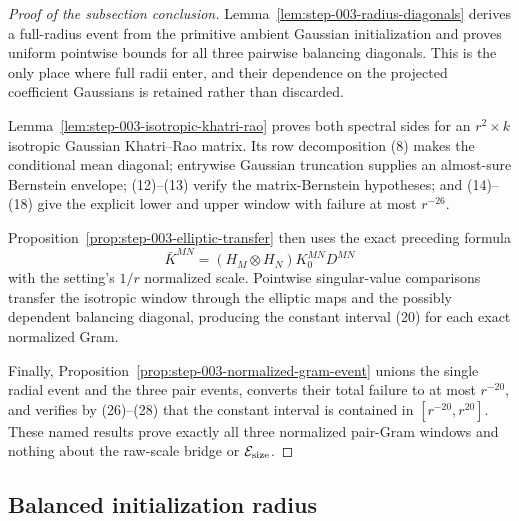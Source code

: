 \begin{proof}[Proof of the subsection conclusion]

Lemma~\ref{lem:step-003-radius-diagonals} derives a full-radius
event from the primitive ambient Gaussian initialization and proves uniform
pointwise bounds for all three pairwise balancing diagonals. This is the only
place where full radii enter, and their dependence on the projected
coefficient Gaussians is retained rather than discarded.

Lemma~\ref{lem:step-003-isotropic-khatri-rao} proves both spectral sides for
an \(r^2\times k\) isotropic Gaussian Khatri--Rao matrix. Its row
decomposition (8) makes the conditional mean diagonal; entrywise Gaussian
truncation supplies an almost-sure Bernstein envelope; (12)--(13) verify the
matrix-Bernstein hypotheses; and (14)--(18) give the explicit lower and upper
window with failure at most \(r^{-26}\).

Proposition~\ref{prop:step-003-elliptic-transfer} then uses the exact
preceding formula
\[
  \bar K^{MN}=(H_M\otimes H_N)K_0^{MN}D^{MN}
\]
with the setting's \(1/r\) normalized scale. Pointwise singular-value
comparisons transfer the isotropic window through the elliptic maps and the
possibly dependent balancing diagonal, producing the constant interval (20)
for each exact normalized Gram.

Finally, Proposition~\ref{prop:step-003-normalized-gram-event} unions the
single radial event and the three pair events, converts their total failure to
at most \(r^{-20}\), and verifies by (26)--(28) that the constant interval is
contained in \([r^{-20},r^{20}]\). These named results prove exactly all three
normalized pair-Gram windows and nothing about the raw-scale bridge or
\(\mathcal E_{\rm size}\).

\end{proof}

\subsection{Balanced initialization radius}\label{app:step-004}

